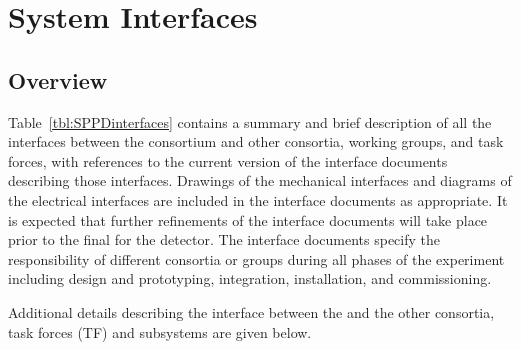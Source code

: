 \section{System Interfaces}
\label{sec:fdsp-pd-intfc}
\subsection{Overview}
Table~\ref{tbl:SPPDinterfaces} contains a summary and brief description of all the interfaces between the   consortium and other consortia, working groups, and task forces, with references to the current version of the interface documents describing those interfaces.  
Drawings of the mechanical interfaces and diagrams of the electrical interfaces are 
included in the interface documents as appropriate.
It is expected that further refinements of the interface documents will take place prior to the final  for the detector. The interface documents specify the responsibility of different consortia or groups during all phases of the experiment including design and prototyping, integration,  installation, and  commissioning.

Additional details describing the interface between the   and the other consortia, task forces (TF) and subsystems are given below.

